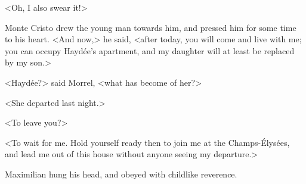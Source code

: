  <Oh, I also swear it!> 

 Monte Cristo drew the young man towards him, and pressed him for some time to his heart. <And now,> he said, <after today, you will come and live with me; you can occupy Haydée's apartment, and my daughter will at least be replaced by my son.> 

 <Haydée?> said Morrel, <what has become of her?> 

 <She departed last night.> 

 <To leave you?> 

 <To wait for me. Hold yourself ready then to join me at the Champs-Élysées, and lead me out of this house without anyone seeing my departure.> 

 Maximilian hung his head, and obeyed with childlike reverence. 